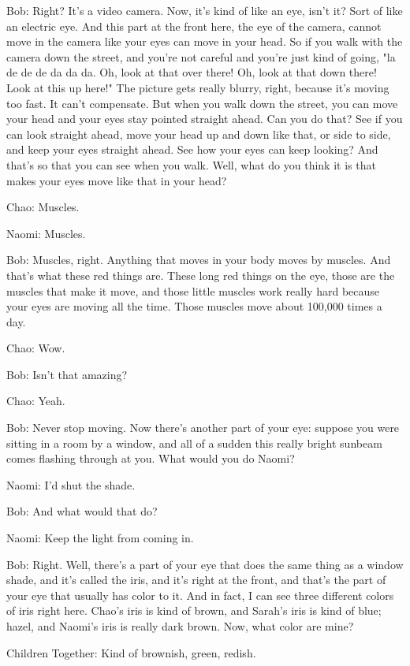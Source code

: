 Bob: Right? It's a video camera. Now, it's kind of like an eye, isn't it? Sort of like an electric eye. And this part at the front here, the eye of the camera, cannot move in the camera like your eyes can move in your head. So if you walk with the camera down the street, and you're not careful and you're just kind of going, "la de de de da da da. Oh, look at that over there! Oh, look at that down there! Look at this up here!" The picture gets really blurry, right, because it's moving too fast. It can't compensate. But when you walk down the street, you can move your head and your eyes stay pointed straight ahead. Can you do that? See if you can look straight ahead, move your head up and down like that, or side to side, and keep your eyes straight ahead. See how your eyes can keep looking? And that's so that you can see when you walk. Well, what do you think it is that makes your eyes move like that in your head?

Chao: Muscles.

Naomi: Muscles.

Bob: Muscles, right. Anything that moves in your body moves by muscles. And that's what these red things are. These long red things on the eye, those are the muscles that make it move, and those little muscles work really hard because your eyes are moving all the time. Those muscles move about 100,000 times a day.

Chao: Wow.

Bob: Isn't that amazing?

Chao: Yeah.

Bob: Never stop moving. Now there's another part of your eye: suppose you were sitting in a room by a window, and all of a sudden this really bright sunbeam comes flashing through at you. What would you do Naomi?

Naomi: I'd shut the shade.

Bob: And what would that do?

Naomi: Keep the light from coming in.

Bob: Right. Well, there's a part of your eye that does the same thing as a window shade, and it's called the iris, and it's right at the front, and that's the part of your eye that usually has color to it. And in fact, I can see three different colors of iris right here. Chao's iris is kind of brown, and Sarah's iris is kind of blue; hazel, and Naomi's iris is really dark brown. Now, what color are mine?

Children Together: Kind of brownish, green, redish.

